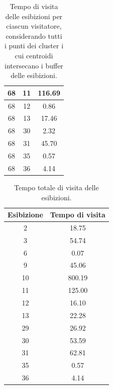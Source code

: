 \documentclass[12pt]{article}
\begin{document}
\begin{table}[!ht]
\begin{tabular}{|c|c|c|}
        68                  & 11                  & 116.69                   \\ \hline
        68                  & 12                  & 0.86                     \\ \hline
        68                  & 13                  & 17.46                    \\ \hline
        68                  & 30                  & 2.32                     \\ \hline
        68                  & 31                  & 45.70                    \\ \hline
        68                  & 35                  & 0.57                     \\ \hline
        68                  & 36                  & 4.14                     \\ \hline
    \end{tabular}
    \caption{Tempo di visita delle esibizioni per ciascun visitatore, considerando tutti i punti dei cluster i cui centroidi intersecano i buffer delle esibizioni.}
    \label{persons_time_visiting_cluster}
\end{table}

\begin{table}[!ht]
    \centering
    \begin{tabular}{|c|c|}
        \hline
        \textbf{Esibizione} & \textbf{Tempo di visita} \\ \hline
        2                   & 18.75                    \\ \hline
        3                   & 54.74                    \\ \hline
        6                   & 0.07                     \\ \hline
        9                   & 45.06                    \\ \hline
        10                  & 800.19                   \\ \hline
        11                  & 125.00                   \\ \hline
        12                  & 16.10                    \\ \hline
        13                  & 22.28                    \\ \hline
        29                  & 26.92                    \\ \hline
        30                  & 53.59                    \\ \hline
        31                  & 62.81                    \\ \hline
        35                  & 0.57                     \\ \hline
        36                  & 4.14                     \\ \hline
    \end{tabular}
    \caption{Tempo totale di visita delle esibizioni.}
    \label{exhibits_time_visiting}
\end{table}
\end{document}
